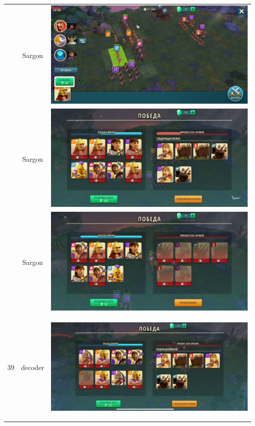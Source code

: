 \begin{longtable}{|c|c|c|}
	& Sargon &
	\includegraphics[width=0.75\linewidth]{./parts/media/TreasureHunt/39/sargon/photo_2022-04-07_13-18-26.jpg} \\
	& Sargon &
	\includegraphics[width=0.75\linewidth]{./parts/media/TreasureHunt/39/sargon/photo_2022-04-07_13-18-21.jpg} \\
	& Sargon &
	\includegraphics[width=0.75\linewidth]{./parts/media/TreasureHunt/39/sargon/photo_2022-04-07_13-18-31.jpg} \\
	\hline
	\multirow{8}{*}{39} & decoder &
	\hypertarget{fight39}{\includegraphics[width=0.75\linewidth]{./parts/media/TreasureHunt/39/decoder/photo_2022-04-07_13-15-36.jpg}} \\

\end{longtable}
